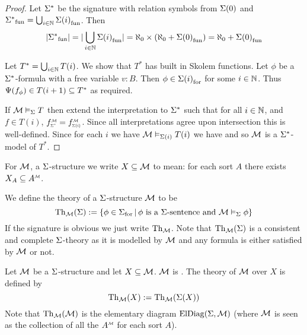 \begin{proof}
    Let $\Sigma^*$ 
    be the signature with relation symbols from $\Sigma(0)$
    and ${\Sigma^*}_\mathrm{fun} = \bigcup_{i \in \mathbb{N}} {\Sigma(i)}_\mathrm{fun}$.
    Then 
    \[
        |{\Sigma^*}_\mathrm{fun}| = |\bigcup_{i \in \mathbb{N}} {\Sigma(i)}_\mathrm{fun}| = 
        \aleph_0 \times (\aleph_0 + {\Sigma(0)}_\mathrm{fun}) = 
        \aleph_0 + {\Sigma(0)}_\mathrm{fun}
    \]

    Let $T^* = \bigcup_{i \in \mathbb{N}} T(i)$.
    We show that $T^*$ has built in Skolem functions.
    Let $\phi$ be a $\Sigma^*$-formula with a free variable $v : B$.
    Then $\phi \in {\Sigma(i)}_\mathrm{for}$ for some $i \in \mathbb{N}$. 
    Thus $\Psi(f_\phi) \in T(i+1) \subseteq T^*$ as required.
    
    If $\mathcal{M} \vDash_{\Sigma} T$ then extend the interpretation 
    to $\Sigma^*$ such that for all $i \in \mathbb{N}$, 
    and $f \in T(i)$, 
    $\subintp{\Si^*}{\MM}{f} = \subintp{\Si(i)}{\MM}{f}$.
    Since all interpretations agree upon intersection this is well-defined.
    Since for each $i$ we have $\mathcal{M} \vDash_{\Sigma(i)} T(i)$
    we have  and so 
    $\mathcal{M}$ is a $\Sigma^*$-model of $T^*$.
\end{proof}

\begin{dfn}
    \begin{nttn}
        For $\mathcal{M}$, a $\Sigma$-structure we write $X \subseteq \mathcal{M}$
        to mean: for each sort $A$ there exists 
        $X_A \subs \mmintp{A}$.
    \end{nttn}

    We define the theory of a $\Sigma$-structure $\mathcal{M}$ to be
    \[\mathrm{Th}_{\mathcal{M}}(\Sigma) := \left\{\phi \in {\Sigma}_\mathrm{for} \,|\, 
    \phi \text{ is a $\Sigma$-sentence and } \mathcal{M} \vDash_{\Sigma} \phi\right\}\]
    If the signature is obvious we just write $\mathrm{Th}_{\mathcal{M}}$.
    Note that $\mathrm{Th}_{\mathcal{M}}(\Sigma)$ is a consistent and complete $\Sigma$-theory
    as it is modelled by $\mathcal{M}$ 
    and any formula is either satisfied by $\mathcal{M}$ or not.
    
    Let $\mathcal{M}$ be a $\Sigma$-structure and let $X \subseteq \mathcal{M}$.
    $\mathcal{M}$ is . 
    The theory of $\mathcal{M}$ over $X$ is defined by
    \[\mathrm{Th}_{\mathcal{M}}(X):= \mathrm{Th}_{\mathcal{M}}(\Sigma(X))\]
    Note that $\mathrm{Th}_{\mathcal{M}}(\mathcal{M})$ is the elementary diagram $\mathrm{ElDiag}(\Sigma,\mathcal{M})$
    (where $\mathcal{M}$ is seen as the collection of 
    all the $\mmintp{A}$ for each sort $A$).
\end{dfn}

